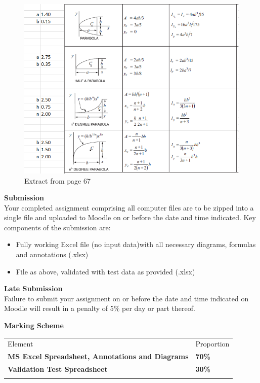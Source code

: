\begin{figure}
	\centering
	\includegraphics[width=1.0\linewidth]{img/Ass2Img3}
	\caption{Extract from page 67}
	\label{fig:ass2img3}
\end{figure}



\newpage


\textbf{Submission}\\
Your completed assignment comprising all computer files are to be zipped into a single file and uploaded to Moodle on or before the date and time indicated.  Key components of the submission are:
\begin{itemize}
	\item Fully working Excel file (no input data)with all necessary diagrams, formulas and annotations (.xlsx)
	\item File as above, validated with test data as provided (.xlsx)
\end{itemize}




\textbf{Late Submission}\\
Failure to submit your assignment on or before the date and time indicated on Moodle will result in a penalty of 5\% per day or part thereof.

\vspace{0.5cm}
\textbf{Marking Scheme}

\begin{table}[h!]
     \begin{center}
     \begin{tabular}{p{9cm}  p{2cm} }
     \toprule
      \textbf\large{Element} & \textbf\large{Proportion} \\ 
    \cmidrule(r){1-1}\cmidrule(lr){2-2}
      \textbf{MS Excel Spreadsheet, Annotations and Diagrams } & \textbf{70\%}\\
      \textbf{Validation Test Spreadsheet} & \textbf{30\%}\\
      \\ \bottomrule
      \end{tabular}
      \label{tbl:markSchemeAsmt3}
      \end{center}
 \end{table}


